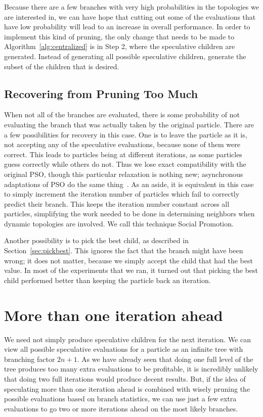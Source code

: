 \documentclass[ms,electronic,twosidetoc,letterpaper,chaptercenter,parttop,equalmargins]{byumsphd}
\renewcommand{\sec}[1]{Section~\ref{sec:#1}}
\newcommand{\alg}[1]{Algorithm~\ref{alg:#1}}
\begin{document}
Because there are a few branches with very high probabilities in the topologies
we are interested in, we can have hope that cutting out some of the evaluations
that have low probability will lead to an increase in overall performance.  In
order to implement this kind of pruning, the only change that needs to be made
to \alg{centralized} is in Step 2, where the speculative children are
generated.  Instead of generating all possible speculative children, generate
the subset of the children that is desired.

\subsection{Recovering from Pruning Too Much}
\label{sec:wrong}

When not all of the branches are evaluated, there is some probability of not
evaluating the branch that was actually taken by the original particle.  There
are a few possibilities for recovery in this case.  One is to leave the
particle as it is, not accepting any of the speculative evaluations, because
none of them were correct.  This leads to particles being at different
iterations, as some particles guess correctly while others do not.  Thus we
lose exact compatibility with the original PSO, though this particular
relaxation is nothing new; asynchronous adaptations of PSO do the same
thing~\citep{koh-2006-parallel-asynchronous-pso}.  As an aside, it is equivalent
in this case to simply increment the iteration number of particles which fail
to correctly predict their branch.  This keeps the iteration number constant
across all particles, simplifying the work needed to be done in determining
neighbors when dynamic topologies are involved.  We call this technique Social
Promotion.

Another possibility is to pick the best child, as described in \sec{pickbest}.
This ignores the fact that the branch might have been wrong; it does not
matter, because we simply accept the child that had the best value.  In most of
the experiments that we ran, it turned out that picking the best child
performed better than keeping the particle back an iteration.

\section{More than one iteration ahead}
\label{sec:manyiters}

We need not simply produce speculative children for the next iteration.  We can
view all possible speculative evaluations for a particle as an infinite tree
with branching factor $2n+1$.  As we have already seen that doing one full
level of the tree produces too many extra evaluations to be profitable, it is
incredibly unlikely that doing two full iterations would produce decent
results.  But, if the idea of speculating more than one iteration ahead is
combined with wisely pruning the possible evaluations based on branch
statistics, we can use just a few extra evaluations to go two or more
iterations ahead on the most likely branches.
\end{document}
